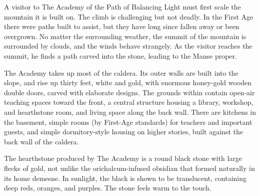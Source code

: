 A visitor to The Academy of the Path of Balancing Light must first scale the
mountain it is built on. The climb is challenging but not deadly. In the First
Age there were paths built to assist, but they have long since fallen away or
been overgrown. No matter the surrounding weather, the summit of the mountain
is surrounded by clouds, and the winds behave strangely. As the visitor reaches
the summit, he finds a path carved into the stone, leading to the Manse proper.

The Academy takes up most of the caldera. Its outer walls are built into the
slope, and rise up thirty feet, white and gold, with enormous honey-gold wooden
double doors, carved with elaborate designs. The grounds within contain
open-air teaching spaces toward the front, a central structure housing a
library, workshop, and hearthstone room, and living space along the back wall.
There are kitchens in the basement, simple rooms (by First-Age standards)
for teachers and important guests, and simple dormitory-style housing on higher
stories, built against the back wall of the caldera.

% 
% 




The hearthstone produced by The Academy is a round black stone with large
flecks of gold, not unlike the orichalcum-infused obsidian that formed
naturally in its home demesne. In sunlight, the black is shown to be
translucent, containing deep reds, oranges, and purples. The stone feels warm
to the touch.




